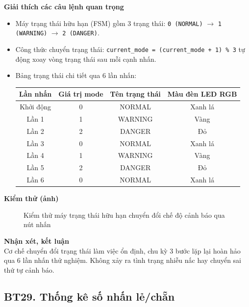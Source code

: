 \noindent\textbf{Giải thích các câu lệnh quan trọng}\\
\begin{itemize}
    \item Máy trạng thái hữu hạn (FSM) gồm 3 trạng thái: \texttt{0 (NORMAL)} $\to$ \texttt{1 (WARNING)} $\to$ \texttt{2 (DANGER)}.
    \item Công thức chuyển trạng thái: \texttt{current\_mode = (current\_mode + 1) \% 3} tự động xoay vòng trạng thái sau mỗi cạnh nhấn.
    \item Bảng trạng thái chi tiết qua 6 lần nhấn:
    \begin{center}
    \begin{tabular}{|c|c|c|c|}
    \hline
    \textbf{Lần nhấn} & \textbf{Giá trị mode} & \textbf{Tên trạng thái} & \textbf{Màu đèn LED RGB} \\ \hline
    Khởi động & 0 & NORMAL & Xanh lá \\ \hline
    Lần 1 & 1 & WARNING & Vàng \\ \hline
    Lần 2 & 2 & DANGER & Đỏ \\ \hline
    Lần 3 & 0 & NORMAL & Xanh lá \\ \hline
    Lần 4 & 1 & WARNING & Vàng \\ \hline
    Lần 5 & 2 & DANGER & Đỏ \\ \hline
    Lần 6 & 0 & NORMAL & Xanh lá \\ \hline
    \end{tabular}
    \end{center}
\end{itemize}

\noindent\textbf{Kiểm thử (ảnh)}\\
\begin{figure}[H]
    \centering
    \caption{Kiểm thử máy trạng thái hữu hạn chuyển đổi chế độ cảnh báo qua nút nhấn}
    \label{fig:bt28}
\end{figure}

\noindent\textbf{Nhận xét, kết luận}\\
Cơ chế chuyển đổi trạng thái làm việc ổn định, chu kỳ 3 bước lặp lại hoàn hảo qua 6 lần nhấn thử nghiệm. Không xảy ra tình trạng nhiễu nấc hay chuyển sai thứ tự cảnh báo.


\subsection*{BT29. Thống kê số nhấn lẻ/chẵn}


